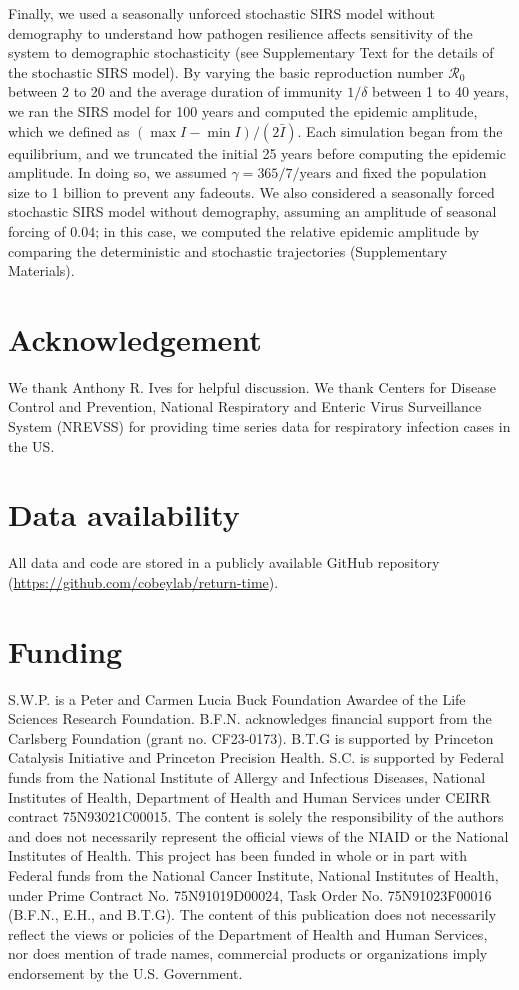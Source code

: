 \documentclass[12pt]{article}
\begin{document}
Finally, we used a seasonally unforced stochastic SIRS model without demography to understand how pathogen resilience affects sensitivity of the system to demographic stochasticity (see Supplementary Text for the details of the stochastic SIRS model).
By varying the basic reproduction number $\mathcal R_0$ between 2 to 20 and the average duration of immunity $1/\delta$ between 1 to 40 years, we ran the SIRS model for 100 years and computed the epidemic amplitude, which we defined as  $(\max I - \min I)/(2 \bar{I})$.
Each simulation began from the equilibrium, and we truncated the initial 25 years before computing the epidemic amplitude.
In doing so, we assumed $\gamma=365/7/\mathrm{years}$ and fixed the population size to 1 billion to prevent any fadeouts.
We also considered a seasonally forced stochastic SIRS model without demography, assuming an amplitude of seasonal forcing of $0.04$;
in this case, we computed the relative epidemic amplitude by comparing the deterministic and stochastic trajectories (Supplementary Materials).

\section*{Acknowledgement}

We thank Anthony R. Ives for helpful discussion.
We thank Centers for Disease Control and Prevention, National Respiratory and Enteric Virus Surveillance System (NREVSS) for providing time series data for respiratory infection cases in the US.

\section*{Data availability}

All data and code are stored in a publicly available GitHub repository (\url{https://github.com/cobeylab/return-time}).

\section*{Funding}

S.W.P. is a Peter and Carmen Lucia Buck Foundation Awardee of the Life Sciences Research Foundation. 
B.F.N. acknowledges financial support from the Carlsberg Foundation (grant no. CF23-0173).
B.T.G is supported by Princeton Catalysis Initiative and Princeton Precision Health.
S.C. is supported by Federal funds from the National Institute of Allergy and Infectious Diseases, National Institutes of Health, Department of Health and Human Services under CEIRR contract 75N93021C00015.
The content is solely the responsibility of the authors and does not necessarily represent the official views of the NIAID or the National Institutes of Health. 
This project has been funded in whole or in part with Federal funds from the National Cancer Institute, National Institutes of Health, under Prime Contract No. 75N91019D00024, Task Order No. 75N91023F00016 (B.F.N., E.H., and B.T.G). 
The content of this publication does not necessarily reflect the views or policies of the Department of Health and Human Services, nor does mention of trade names, commercial products or organizations imply endorsement by the U.S. Government.
\end{document}
